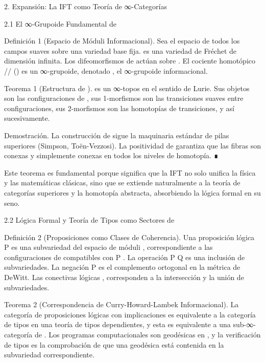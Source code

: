 \documentclass[12pt,twoside]{book}
\begin{document}
2. Expansión: La IFT como Teoría de ∞-Categorías

2.1 El ∞-Grupoide Fundamental de  \rho 

Definición 1 (Espacio de Móduli Informacional). Sea    el espacio de todos los campos  \rho  suaves sobre una variedad base    fija.    es una variedad de Fréchet de dimensión infinita. Los difeomorfismos de    actúan sobre   . El cociente homotópico   /\!/ ()  es un ∞-grupoide, denotado   , el ∞-grupoide informacional.

Teorema 1 (Estructura de   ).    es un ∞-topos en el sentido de Lurie. Sus objetos son las configuraciones de  \rho , sus 1-morfismos son las transiciones suaves entre configuraciones, sus 2-morfismos son las homotopías de transiciones, y así sucesivamente.

Demostración. La construcción de    sigue la maquinaria estándar de pilas superiores (Simpson, Toën-Vezzosi). La positividad de  \rho  garantiza que las fibras son conexas y simplemente conexas en todos los niveles de homotopía. ∎

Este teorema es fundamental porque significa que la IFT no solo unifica la física y las matemáticas clásicas, sino que se extiende naturalmente a la teoría de categorías superiores y la homotopía abstracta, absorbiendo la lógica formal en su seno.

2.2 Lógica Formal y Teoría de Tipos como Sectores de   

Definición 2 (Proposiciones como Clases de Coherencia). Una proposición lógica  P  es una subvariedad del espacio de móduli   , correspondiente a las configuraciones de  \rho  compatibles con  P . La operación  P \implies Q  es una inclusión de subvariedades. La negación  \neg P  es el complemento ortogonal en la métrica de DeWitt. Las conectivas lógicas  \land, \lor  corresponden a la intersección y la unión de subvariedades.

Teorema 2 (Correspondencia de Curry-Howard-Lambek Informacional). La categoría de proposiciones lógicas con implicaciones es equivalente a la categoría de tipos en una teoría de tipos dependientes, y esta es equivalente a una sub-∞-categoría de   . Los programas computacionales son geodésicas en   , y la verificación de tipos es la comprobación de que una geodésica está contenida en la subvariedad correspondiente.
\end{document}
